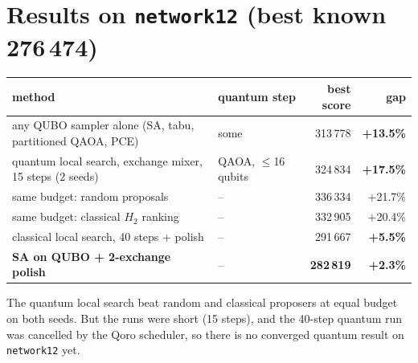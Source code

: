 \documentclass[11pt]{article}
\newcommand{\gapmid}[1]{\textcolor{mid}{\textbf{#1}}}
\newcommand{\gapbad}[1]{\textcolor{bad}{\textbf{#1}}}
\begin{document}
\section{Results on \texttt{network12} (best known 276\,474)}
\begin{center}\small
\begin{tabularx}{\textwidth}{@{}L>{\raggedright\arraybackslash}p{30mm}rr@{}}
\toprule
method & quantum step & best score & gap\\
\midrule
any QUBO sampler alone (SA, tabu, partitioned QAOA, PCE) & some & 313\,778 & \gapbad{+13.5\%}\\
quantum local search, exchange mixer, 15 steps (2 seeds) & QAOA, $\le$16 qubits & 324\,834 & \gapbad{+17.5\%}\\
\quad same budget: random proposals & -- & 336\,334 & +21.7\%\\
\quad same budget: classical $H_2$ ranking & -- & 332\,905 & +20.4\%\\
classical local search, 40 steps + polish & -- & 291\,667 & \gapmid{+5.5\%}\\
\textbf{SA on QUBO + 2-exchange polish} & -- & \textbf{282\,819} & \gapmid{\textbf{+2.3\%}}\\
\bottomrule
\end{tabularx}
\end{center}
The quantum local search beat random and classical proposers at equal budget on both seeds. But
the runs were short (15 steps), and the 40-step quantum run was cancelled by the Qoro scheduler, so
there is no converged quantum result on \texttt{network12} yet.

\end{document}
